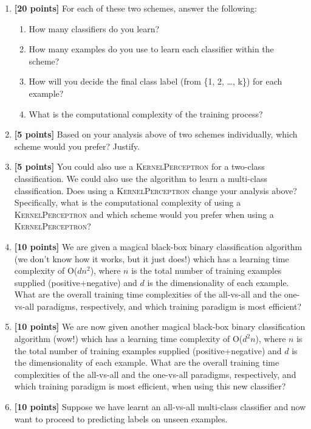 \documentclass[12pt]{article}
\begin{document}
\begin{enumerate}
\item {\bf [20 points]} For each of these two schemes, answer the following:
\begin{enumerate}
\item How many classifiers do you learn?
\item How many examples do you use to learn each classifier within the scheme?
\item How will you decide the final class label (from \{1, 2, \ldots, k\}) for each example?
\item What is the computational complexity of the training process?
\end{enumerate}
\item {\bf [5 points]} Based on your analysis above of two schemes individually, which scheme would you prefer? Justify.
\item {\bf [5 points]} You could also use a \textsc{KernelPerceptron} for a two-class classification. We could also use the algorithm to learn a multi-class classification. Does using a \textsc{KernelPerceptron} change your analysis above? Specifically, what is the computational complexity of using a \textsc{KernelPerceptron} and which scheme would you prefer when using a \textsc{KernelPerceptron}? 

\item {\bf [10 points]} We are given a magical black-box binary classification algorithm (we don’t know how it works, but it just does!) which has a learning time complexity of O($dn^2$), where $n$ is the total number of training examples supplied (positive+negative) and $d$ is the dimensionality of each example.
What are the overall training time complexities of the all-vs-all and the one-vs-all
paradigms, respectively, and which training paradigm is most efficient?

\item {\bf [10 points]} We are now given another magical black-box binary classification algorithm (wow!) which has a learning time complexity of O($d^2 n$), where $n$ is the total number of training examples supplied (positive+negative) and $d$ is the dimensionality of each example.
What are the overall training time complexities of the all-vs-all and the one-vs-all paradigms, respectively, and which training paradigm is most efficient, when using this new classifier?

\item {\bf [10 points]} Suppose we have learnt an all-vs-all multi-class classifier and now want to proceed to predicting labels on unseen examples.


\end{enumerate}
\end{document}
